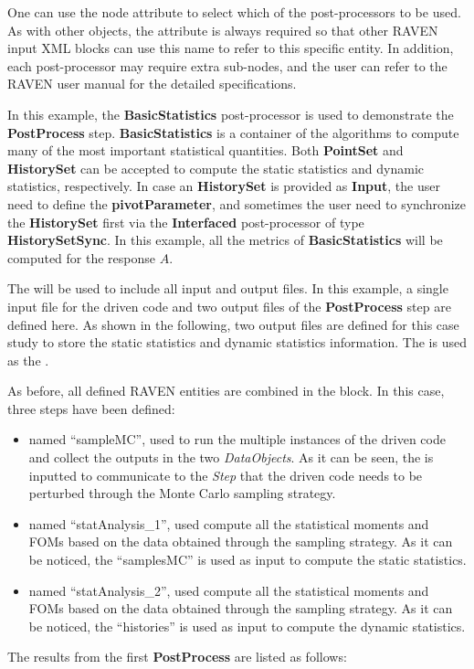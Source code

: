One can use the node attribute  to select which of the post-processors to be used. As with other
objects, the attribute  is always required so that other RAVEN input XML blocks can use this name
to refer to this specific entity. In addition, each post-processor may require extra sub-nodes, and the user can refer
to the RAVEN user manual for the detailed specifications.

In this example, the \textbf{BasicStatistics} post-processor is used to demonstrate the \textbf{PostProcess} step.
\textbf{BasicStatistics} is a container of the algorithms to compute many of the most important statistical quantities.
Both \textbf{PointSet} and \textbf{HistorySet} can be accepted to compute the static statistics and dynamic statistics,
respectively. In case an \textbf{HistorySet} is provided as \textbf{Input}, the user need to define the \textbf{pivotParameter},
and sometimes the user need to synchronize the \textbf{HistorySet} first via the \textbf{Interfaced} post-processor of
type \textbf{HistorySetSync}.
In this example, all the metrics of \textbf{BasicStatistics} will be computed for the response $A$.

The  will be used to include all input and output files. In this example, a single input file
for the driven code and two output files of the \textbf{PostProcess} step are defined here. As shown in the following,
two output files are defined for this case study to store the static statistics and dynamic statistics information.
The  is used as the .


As before, all defined RAVEN entities are combined in the  block.
In this case, three steps have been defined:

\begin{itemize}
  \item {} named ``sampleMC'', used to run the multiple instances of the driven code and
     collect the outputs in the two \textit{DataObjects}. As it can be seen, the  is inputted
     to communicate to the \textit{Step} that the driven code needs to be perturbed through the Monte Carlo sampling
     strategy.
  \item {} named ``statAnalysis\_1'', used compute all the statistical moments and FOMs
    based on the data obtained through the sampling strategy. As it can be noticed, the 
    ``samplesMC'' is used as input to compute the static statistics.
  \item {} named ``statAnalysis\_2'', used compute all the statistical moments and FOMs
    based on the data obtained through the sampling strategy. As it can be noticed, the 
    ``histories'' is used as input to compute the dynamic statistics.
\end{itemize}

The results from the first \textbf{PostProcess} are listed as follows:
